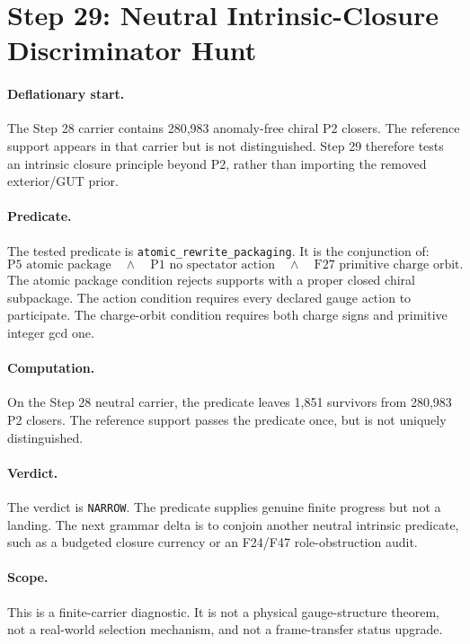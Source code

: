 \section{Step 29: Neutral Intrinsic-Closure Discriminator Hunt}

\paragraph{Deflationary start.}
The Step 28 carrier contains 280,983 anomaly-free chiral P2 closers. The reference support appears in that carrier but is not distinguished. Step 29 therefore tests an intrinsic closure principle beyond P2, rather than importing the removed exterior/GUT prior.

\paragraph{Predicate.}
The tested predicate is \texttt{atomic\_rewrite\_packaging}. It is the conjunction of:
\[
\text{P5 atomic package} \quad \wedge \quad
\text{P1 no spectator action} \quad \wedge \quad
\text{F27 primitive charge orbit}.
\]
The atomic package condition rejects supports with a proper closed chiral subpackage. The action condition requires every declared gauge action to participate. The charge-orbit condition requires both charge signs and primitive integer gcd one.

\paragraph{Computation.}
On the Step 28 neutral carrier, the predicate leaves 1,851 survivors from 280,983 P2 closers. The reference support passes the predicate once, but is not uniquely distinguished.

\paragraph{Verdict.}
The verdict is \texttt{NARROW}. The predicate supplies genuine finite progress but not a landing. The next grammar delta is to conjoin another neutral intrinsic predicate, such as a budgeted closure currency or an F24/F47 role-obstruction audit.

\paragraph{Scope.}
This is a finite-carrier diagnostic. It is not a physical gauge-structure theorem, not a real-world selection mechanism, and not a frame-transfer status upgrade.
